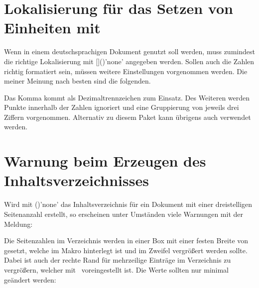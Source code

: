 \section{Lokalisierung für das Setzen von Einheiten mit }
%
%
%
Wenn  in einem deutschsprachigen Dokument genutzt soll
werden, muss zumindest die richtige Lokalisierung mit
[]()'none' angegeben 
werden. Sollen auch die Zahlen richtig formatiert sein, müssen weitere 
Einstellungen vorgenommen werden. Die meiner Meinung nach besten sind die 
folgenden.
%
\begin{quoting}
\begin{Code}
\end{Code}
\end{quoting}
%
Das Komma kommt als Dezimaltrennzeichen zum Einsatz. Des Weiteren werden Punkte 
innerhalb der Zahlen ignoriert und eine Gruppierung von jeweils drei Ziffern 
vorgenommen. Alternativ zu diesem Paket kann übrigens auch  
verwendet werden.



\section{Warnung beim Erzeugen des Inhaltsverzeichnisses}
%
%
Wird mit ()'none' das 
Inhaltsverzeichnis für ein Dokument mit einer dreistelligen Seitenanzahl 
erstellt, so erscheinen unter Umständen viele Warnungen mit der Meldung:
%
\begin{quoting}
\end{quoting}
%
Die Seitenzahlen im Verzeichnis werden in einer Box mit einer festen Breite 
von~\PValue{1.55em} gesetzt, welche im Makro  hinterlegt ist 
und im Zweifel vergrößert werden sollte. Dabei ist auch der rechte Rand für 
mehrzeilige Einträge im Verzeichnis  zu vergrößern, welcher 
mit~\PValue{2.55em} voreingestellt ist. Die Werte sollten nur minimal geändert 
werden:
%
\begin{quoting}
\begin{Code}
\makeatletter
\renewcommand*{\@pnumwidth}{1.7em}\renewcommand*{\@tocrmarg}{2.7em}
\makeatother
\end{Code}
\end{quoting}



